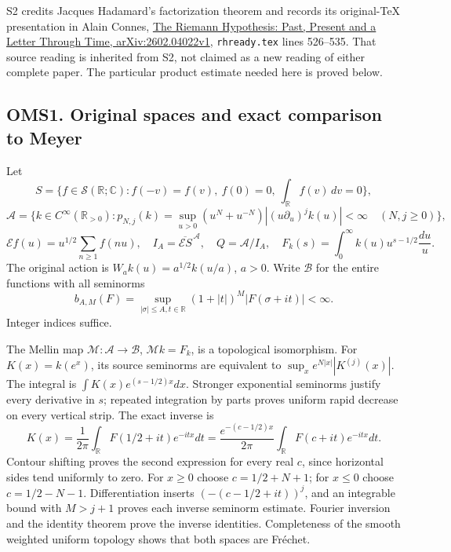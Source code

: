 S2 credits Jacques Hadamard's factorization theorem and records its
original-TeX presentation in Alain Connes,
\href{https://arxiv.org/abs/2602.04022v1}{The Riemann Hypothesis: Past,
Present and a Letter Through Time, arXiv:2602.04022v1}, \nolinkurl{rhready.tex}
lines 526--535. That source reading is inherited from S2, not claimed as
a new reading of either complete paper. The particular product estimate
needed here is proved below.

\subsection{OMS1. Original spaces and exact comparison to
Meyer}\label{oms1.-original-spaces-and-exact-comparison-to-meyer}

Let \[
S=\{f\in\mathcal S(\mathbb R;\mathbb C): f(-v)=f(v),\
f(0)=0,\ \int_{\mathbb R}f(v)\,dv=0\},
\] \[
\mathcal A=\{k\in C^\infty(\mathbb R_{>0}):
p_{N,j}(k)=\sup_{u>0}(u^N+u^{-N})|(u\partial_u)^jk(u)|<\infty
\quad(N,j\ge0)\},
\] \[
\mathcal E f(u)=u^{1/2}\sum_{n\ge1}f(nu),\quad
I_A=\overline{\mathcal ES}^{\,\mathcal A},\quad Q=\mathcal A/I_A,
\quad F_k(s)=\int_0^\infty k(u)u^{s-1/2}\frac{du}{u}.
\tag{OMS1.1}
\] The original action is \(W_a k(u)=a^{1/2}k(u/a)\), \(a>0\). Write
\(\mathcal B\) for the entire functions with all seminorms \[
b_{A,M}(F)=\sup_{|\sigma|\le A,t\in\mathbb R}
(1+|t|)^M|F(\sigma+it)|<\infty.
\tag{OMS1.2}
\] Integer indices suffice.

The Mellin map \(\mathcal M:\mathcal A\to\mathcal B\),
\(\mathcal Mk=F_k\), is a topological isomorphism. For \(K(x)=k(e^x)\),
its source seminorms are equivalent to \(\sup_x e^{N|x|}|K^{(j)}(x)|\).
The integral is \(\int K(x)e^{(s-1/2)x}dx\). Stronger exponential
seminorms justify every derivative in \(s\); repeated integration by
parts proves uniform rapid decrease on every vertical strip. The exact
inverse is \[
K(x)=\frac1{2\pi}\int_{\mathbb R}F(1/2+it)e^{-itx}dt
=\frac{e^{-(c-1/2)x}}{2\pi}
\int_{\mathbb R}F(c+it)e^{-itx}dt .
\tag{OMS1.3}
\] Contour shifting proves the second expression for every real \(c\),
since horizontal sides tend uniformly to zero. For \(x\ge0\) choose
\(c=1/2+N+1\); for \(x\le0\) choose \(c=1/2-N-1\). Differentiation
inserts \((-(c-1/2+it))^j\), and an integrable bound with \(M>j+1\)
proves each inverse seminorm estimate. Fourier inversion and the
identity theorem prove the inverse identities. Completeness of the
smooth weighted uniform topology shows that both spaces are Fréchet.

